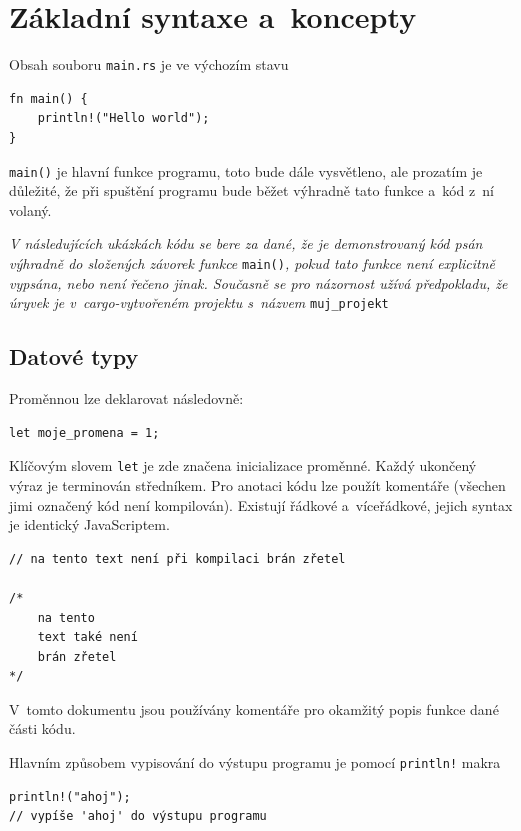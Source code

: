 \documentclass[a4paper, 12pt]{article} %
\newcommand{\rust}[1]{\texttt{#1}}
\begin{document}
\section{Základní syntaxe a~koncepty}
        Obsah souboru \texttt{main.rs} je ve výchozím stavu
        \begin{verbatim}
fn main() {
    println!("Hello world");
}
        \end{verbatim}

        \rust{main()} je hlavní funkce programu, toto bude dále vysvětleno, ale prozatím je důležité, že při spuštění programu bude běžet výhradně tato funkce a~kód z~ní volaný.
        
        \begin{center}
            \textit{V následujících ukázkách kódu se bere za dané, že je demonstrovaný kód psán výhradně do složených závorek funkce }\rust{main()}\textit{, pokud tato funkce není explicitně vypsána, nebo není řečeno jinak. Současně se pro názornost užívá předpokladu, že úryvek je v~cargo-vytvořeném projektu s~názvem }\texttt{muj\_projekt}
        \end{center}

    \subsection{Datové typy}
        Proměnnou lze deklarovat následovně:
        \begin{verbatim}
let moje_promena = 1;
        \end{verbatim}
        
        Klíčovým slovem \rust{let} je zde značena inicializace proměnné. Každý ukončený výraz je terminován středníkem. Pro anotaci kódu lze použít komentáře (všechen jimi označený kód není kompilován). Existují řádkové a~víceřádkové, jejich syntax je identický JavaScriptem.
        \begin{verbatim}
// na tento text není při kompilaci brán zřetel

/*
    na tento
    text také není
    brán zřetel
*/
        \end{verbatim}
        
        V~tomto dokumentu jsou používány komentáře pro okamžitý popis funkce dané části kódu.

        Hlavním způsobem vypisování do výstupu programu je pomocí \rust{println!} makra
        \begin{verbatim}
println!("ahoj");
// vypíše 'ahoj' do výstupu programu
        \end{verbatim}
        
\end{document}
